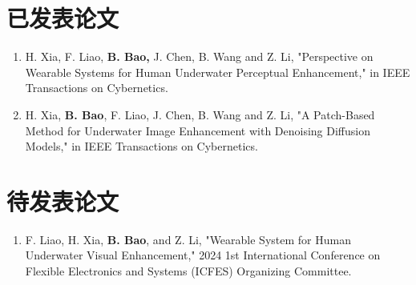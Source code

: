 
\begin{publications}

\section*{已发表论文}

\begin{enumerate}
    \item H. Xia, F. Liao, \textbf{B. Bao,} J. Chen, B. Wang and Z. Li, "Perspective on Wearable Systems for Human
    Underwater Perceptual Enhancement," in IEEE Transactions on Cybernetics.
    \item H. Xia, \textbf{B. Bao}, F. Liao, J. Chen, B. Wang and Z. Li, "A Patch-Based Method for Underwater Image
    Enhancement with Denoising Diffusion Models," in IEEE Transactions on Cybernetics.
\end{enumerate}

\section*{待发表论文}

\begin{enumerate}
\item F. Liao, H. Xia, \textbf{B. Bao}, and Z. Li, "Wearable System for Human Underwater Visual Enhancement," 2024
1st International Conference on Flexible Electronics and Systems (ICFES) Organizing Committee.
\end{enumerate}


\end{publications}
